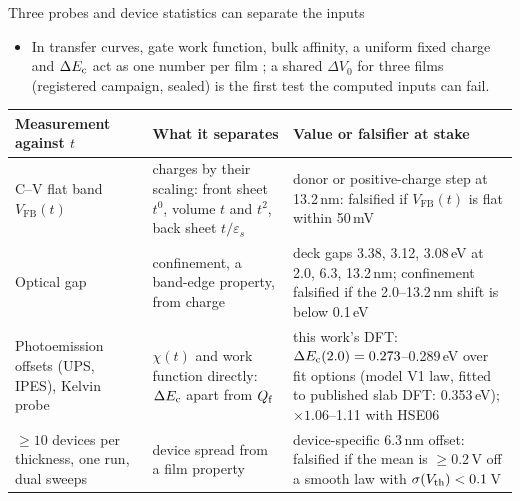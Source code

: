 \begin{frame}[t]{Three probes and device statistics can separate the inputs}
  \tenTop\tendense
  \begin{itemize}
    \item In transfer curves, gate work function, bulk affinity, a uniform fixed charge and $\Delta E_{\mathrm{c}}$ act as one number
      per film ; a shared $\Delta V_0$ for three films (registered campaign, sealed) is the first test
      the computed inputs can fail.
  \end{itemize}
  \vspace{0.5mm}
  \begingroup\scriptsize
  \setlength{\tabcolsep}{4pt}
  \renewcommand{\arraystretch}{1.1}
  \begin{tabularx}{\textwidth}{@{}>{\raggedright\arraybackslash}p{3.2cm}>{\raggedright\arraybackslash}p{4.0cm}
      >{\raggedright\arraybackslash}X@{}}
    \toprule
    Measurement against $t$ & What it separates & Value or falsifier at stake \\
    \midrule
    C--V flat band $V_{\mathrm{FB}}(t)$ & charges by their scaling: front sheet $t^0$, volume $t$ and $t^2$, back sheet
      $t/\varepsilon_s$ &
      donor or positive-charge step at 13.2\,nm: falsified if $V_{\mathrm{FB}}(t)$ is flat within 50\,mV \\
      \addlinespace[1pt]
    Optical gap & confinement, a band-edge property, from charge &
      deck gaps 3.38, 3.12, 3.08\,eV at 2.0, 6.3, 13.2\,nm; confinement falsified if the 2.0--13.2\,nm shift is
      below 0.1\,eV \\ \addlinespace[1pt]
    Photoemission offsets (UPS, IPES), Kelvin probe & $\chi(t)$ and work function directly: $\Delta E_{\mathrm{c}}$ apart from
      $Q_{\mathrm{f}}$ &
      this work's DFT: $\Delta E_{\mathrm{c}}(2.0) = 0.273$--0.289\,eV over fit options (model V1 law, fitted to published slab DFT:
      0.353\,eV); $\times1.06$--1.11 with HSE06 \\ \addlinespace[1pt]
    $\ge 10$ devices per thickness, one run, dual sweeps & device spread from a film property &
      device-specific 6.3\,nm offset: falsified if the mean is $\ge 0.2$\,V off a smooth law with
      $\sigma(V_{\mathrm{th}}) < 0.1$\,V \\
    \bottomrule
  \end{tabularx}\par\endgroup
\end{frame}
